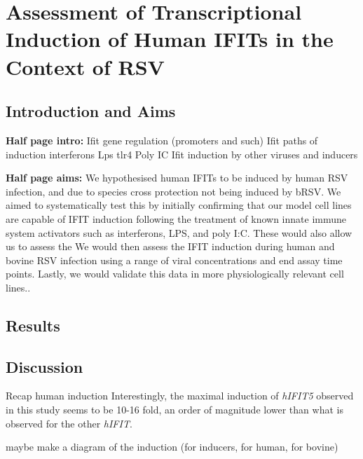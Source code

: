 \chapter{Assessment of Transcriptional Induction of Human IFITs in the Context of RSV} \label{ch:Assessment of Transcriptional Induction of Human IFITs in the Context of RSV}
\section{Introduction and Aims} \label{sec:Introduction and Aims-Chapter 1}
\textbf{Half page intro:}
Ifit gene regulation (promoters and such) \newline
Ifit paths of induction \newline
interferons \newline
Lps tlr4 \newline
Poly IC \newline
Ifit induction by other viruses and inducers \newline

\lipsum[1-2]


\textbf{Half page aims:}
We hypothesised human IFITs to be induced by human RSV infection, and due to species cross protection not being induced by bRSV. We aimed to systematically test this by initially confirming that our model cell lines are capable of IFIT induction following the treatment of known innate immune system activators such as interferons, LPS, and poly I:C. These would also allow us to assess the  We would then assess the IFIT induction during human and bovine RSV infection using a range of viral concentrations and end assay time points. Lastly, we would validate this data in more physiologically relevant cell lines..

\lipsum[1]


\section{Results} \label{sec:Results-Chapter 1}



\section{Discussion} \label{sec:Discussion Chapter 1}
Recap human induction \newline
Interestingly, the maximal induction of \textit{hIFIT5} observed in this study seems to be 10-16 fold, an order of magnitude lower than what is observed for the other \textit{hIFIT}.

maybe make a diagram of the induction (for inducers, for human, for bovine)



\lipsum[1-6]


